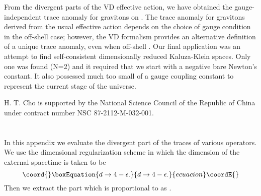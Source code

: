 \documentclass[a4paper,aps,preprint,groupedaddress,showpacs]{revtex4}
\begin{document}
From the divergent parts of the VD effective action, we 
have obtained the gauge-independent trace anomaly
for gravitons on \coordHE{}. The trace anomaly
for gravitons derived from the usual effective action depends
on the choice of gauge condition in the off-shell case; however, 
the VD formalism provides an alternative definition
of a unique trace anomaly, even when 
off-shell \cite{CK3}. Our final application was an attempt to find 
self-consistent dimensionally reduced Kaluza-Klein spaces.
Only one was found (N=2) and it required that we start with
a negative bare Newton's constant. It also possessed much too
small of a gauge coupling constant to represent the current 
stage of the universe. 


\begin{acknowledgments}
H. T. Cho is supported by the National Science Council
of the Republic of China under contract number 
NSC 87-2112-M-032-001. 
\end{acknowledgments}

\appendix
\section*{}

In this appendix we evaluate the divergent part of the traces
of various operators. We use the dimensional regularization
scheme in which the dimension of the external spacetime is taken
to be
\begin{equation}\coord{}\boxEquation{
d\rightarrow 4-\epsilon.
}{
d\rightarrow 4-\epsilon.
}{ecuacion}\coordE{}\end{equation}
Then we extract the part which is proportional to 
\coordHE{} as \coordHE{}. 
\end{document}
